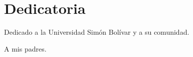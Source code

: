 \chapter*{Dedicatoria}

\par Dedicado a la Universidad Sim\'on Bol\'ivar y a su comunidad.
\par A mis padres.
